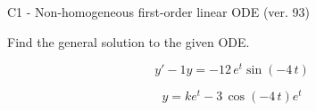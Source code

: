 \begin{exercise}
  \begin{exerciseTitle}C1 - Non-homogeneous first-order linear ODE (ver. 93)\end{exerciseTitle}
  \begin{exerciseStatement}
    
Find the general solution to the given ODE.

    
\[y'-1y= -12 \, e^{t} \sin\left(-4 \, t\right)\]

  \end{exerciseStatement}
  \begin{exerciseAnswer}
    
\[y= k e^{t} - 3 \, \cos\left(-4 \, t\right) e^{t}\]

  \end{exerciseAnswer}
\end{exercise}